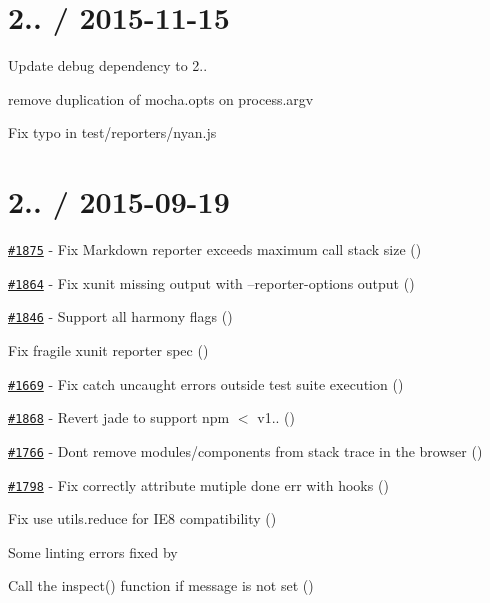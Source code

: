 \section*{2.. / 2015-\/11-\/15}


\begin{DoxyItemize}
\item Update debug dependency to 2..
\item remove duplication of mocha.\+opts on process.\+argv
\item Fix typo in test/reporters/nyan.\+js
\end{DoxyItemize}

\section*{2.. / 2015-\/09-\/19}


\begin{DoxyItemize}
\item \href{https://github.com/mochajs/mocha/issues/1875}{\tt \#1875} -\/ Fix Markdown reporter exceeds maximum call stack size (\href{https://github.com/danielstjules}{\tt })
\item \href{https://github.com/mochajs/mocha/issues/1864}{\tt \#1864} -\/ Fix xunit missing output with --reporter-\/options output (\href{https://github.com/danielstjules}{\tt })
\item \href{https://github.com/mochajs/mocha/issues/1846}{\tt \#1846} -\/ Support all harmony flags (\href{https://github.com/danielstjules}{\tt })
\item Fix fragile xunit reporter spec (\href{https://github.com/danielstjules}{\tt })
\item \href{https://github.com/mochajs/mocha/issues/1669}{\tt \#1669} -\/ Fix catch uncaught errors outside test suite execution (\href{https://github.com/danielstjules}{\tt })
\item \href{https://github.com/mochajs/mocha/issues/1868}{\tt \#1868} -\/ Revert jade to support npm $<$ v1.. (\href{https://github.com/danielstjules}{\tt })
\item \href{https://github.com/mochajs/mocha/issues/1766}{\tt \#1766} -\/ Don\textquotesingle{}t remove modules/components from stack trace in the browser (\href{https://github.com/danielstjules}{\tt })
\item \href{https://github.com/mochajs/mocha/issues/1798}{\tt \#1798} -\/ Fix correctly attribute mutiple done err with hooks (\href{https://github.com/danielstjules}{\tt })
\item Fix use utils.\+reduce for I\+E8 compatibility (\href{https://github.com/wsw0108}{\tt })
\item Some linting errors fixed by \href{https://github.com/danielstjules}{\tt }
\item Call the inspect() function if message is not set (\href{https://github.com/kevinburke}{\tt })
\end{DoxyItemize}

